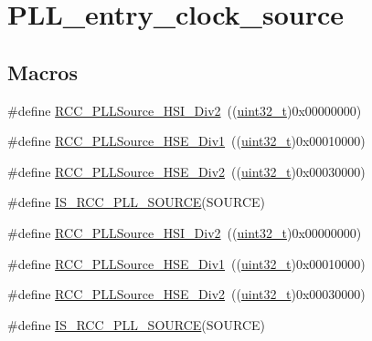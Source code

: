 \hypertarget{group___p_l_l__entry__clock__source}{}\section{P\+L\+L\+\_\+entry\+\_\+clock\+\_\+source}
\label{group___p_l_l__entry__clock__source}
\subsection*{Macros}
\begin{DoxyCompactItemize}
\item 
\#define \hyperlink{group___p_l_l__entry__clock__source_ga53194dd3e2986980b156a3e8e456df06}{R\+C\+C\+\_\+\+P\+L\+L\+Source\+\_\+\+H\+S\+I\+\_\+\+Div2}~((\hyperlink{_p_e___types_8h_a33594304e786b158f3fb30289278f5af}{uint32\+\_\+t})0x00000000)
\item 
\#define \hyperlink{group___p_l_l__entry__clock__source_ga62f02bf60a89bdef0d3a8137da3f4c2d}{R\+C\+C\+\_\+\+P\+L\+L\+Source\+\_\+\+H\+S\+E\+\_\+\+Div1}~((\hyperlink{_p_e___types_8h_a33594304e786b158f3fb30289278f5af}{uint32\+\_\+t})0x00010000)
\item 
\#define \hyperlink{group___p_l_l__entry__clock__source_ga24863bc670737a2f5abce546a49e620c}{R\+C\+C\+\_\+\+P\+L\+L\+Source\+\_\+\+H\+S\+E\+\_\+\+Div2}~((\hyperlink{_p_e___types_8h_a33594304e786b158f3fb30289278f5af}{uint32\+\_\+t})0x00030000)
\item 
\#define \hyperlink{group___p_l_l__entry__clock__source_ga8a8a84a16989bb4e5aca1af65ccf9a1b}{I\+S\+\_\+\+R\+C\+C\+\_\+\+P\+L\+L\+\_\+\+S\+O\+U\+R\+CE}(S\+O\+U\+R\+CE)
\item 
\#define \hyperlink{group___p_l_l__entry__clock__source_ga53194dd3e2986980b156a3e8e456df06}{R\+C\+C\+\_\+\+P\+L\+L\+Source\+\_\+\+H\+S\+I\+\_\+\+Div2}~((\hyperlink{_p_e___types_8h_a33594304e786b158f3fb30289278f5af}{uint32\+\_\+t})0x00000000)
\item 
\#define \hyperlink{group___p_l_l__entry__clock__source_ga62f02bf60a89bdef0d3a8137da3f4c2d}{R\+C\+C\+\_\+\+P\+L\+L\+Source\+\_\+\+H\+S\+E\+\_\+\+Div1}~((\hyperlink{_p_e___types_8h_a33594304e786b158f3fb30289278f5af}{uint32\+\_\+t})0x00010000)
\item 
\#define \hyperlink{group___p_l_l__entry__clock__source_ga24863bc670737a2f5abce546a49e620c}{R\+C\+C\+\_\+\+P\+L\+L\+Source\+\_\+\+H\+S\+E\+\_\+\+Div2}~((\hyperlink{_p_e___types_8h_a33594304e786b158f3fb30289278f5af}{uint32\+\_\+t})0x00030000)
\item 
\#define \hyperlink{group___p_l_l__entry__clock__source_ga8a8a84a16989bb4e5aca1af65ccf9a1b}{I\+S\+\_\+\+R\+C\+C\+\_\+\+P\+L\+L\+\_\+\+S\+O\+U\+R\+CE}(S\+O\+U\+R\+CE)
\end{DoxyCompactItemize}


